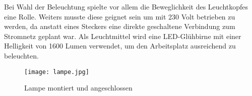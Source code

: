 Bei Wahl der Beleuchtung spielte vor allem die Beweglichkeit des Leuchtkopfes eine Rolle. 
Weiters musste diese geignet sein um mit 230 Volt betrieben zu werden, da anstatt eines Steckers eine direkte geschaltene Verbindung zum Stromnetz geplant war.
Als Leuchtmittel wird eine LED-Glühbirne mit einer Helligkeit von 1600 Lumen verwendet, um den Arbeitsplatz ausreichend zu beleuchten.

\begin{figure}[H]
    \begin{center}
        \texttt{[image: lampe.jpg]}
        \caption{Lampe montiert und angeschlossen}
    \end{center}
\end{figure}